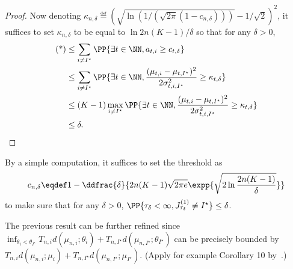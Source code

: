 \begin{proof}
Now denoting $\kappa_{n,\delta} \eqdef \left( \sqrt{\ln(1/(\sqrt{2\pi}(1-c_{n,\delta})))} - 1/\sqrt{2} \right)^2$, it suffices to set $\kappa_{n,\delta}$ to be equal to $\ln{2n(K-1)/\delta}$ so that for any $\delta > 0$,
\begin{align*}
\begin{split}
    \text{(*)} &\leq \sum_{i\neq I^\star} \PP{\exists t \in \NN, a_{t,i} \geq c_{t,\delta}} \\
    &\leq \sum_{i\neq I^\star} \PP{\exists t \in \NN, \frac{(\mu_{t,i}-\mu_{t,I^\star})^2}{2\sigma_{t,i,I^\star}^2} \geq \kappa_{t,\delta}} \\
    &\leq (K-1)\max_{i\neq I^\star} \PP{\exists t \in \NN, \frac{(\mu_{t,i}-\mu_{t,I^\star})^2}{2\sigma_{t,i,I^\star}^2} \geq \kappa_{t,\delta}} \\
    &\leq \delta.
\end{split}
\end{align*}
\end{proof}

By a simple computation, it suffices to set the threshold as
\[
    c_{n,\delta} \eqdef 1 - \ddfrac{\delta}{2n(K-1)\sqrt{2\pi e}\expp{\sqrt{2\ln{\frac{2n(K-1)}{\delta}}}}}
\]
to make sure that for any $\delta > 0$, $\PP{\tau_{\delta} < \infty, J_{\tau_{\delta}}^{(1)} \neq I^\star} \leq \delta$.

The previous result can be further refined since $\inf_{\theta_i<\theta_{I^\star}} T_{n,i}d(\mu_{n,i};\theta_i) + T_{n,I^\star}d(\mu_{n,I^\star};\theta_{I^\star})$ can be precisely bounded by $T_{n,i}d(\mu_{n,i};\mu_i) + T_{n,I^\star}d(\mu_{n,I^\star};\mu_{I^\star})$. (Apply for example Corollary 10 by~\citealt{kaufmann2018mixture}.)
